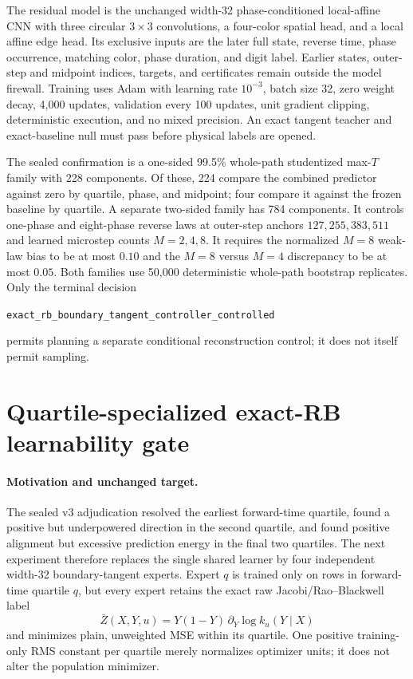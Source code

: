 \documentclass[11pt]{article}
\begin{document}
The residual model is the unchanged width-32 phase-conditioned
local-affine CNN with three circular $3\times3$ convolutions, a four-color
spatial head, and a local affine edge head. Its exclusive inputs are the later
full state, reverse time, phase occurrence, matching color, phase duration,
and digit label. Earlier states, outer-step and midpoint indices, targets, and
certificates remain outside the model firewall. Training uses Adam with
learning rate $10^{-3}$, batch size 32, zero weight decay, 4,000 updates,
validation every 100 updates, unit gradient clipping, deterministic execution,
and no mixed precision. An exact tangent teacher and exact-baseline null must
pass before physical labels are opened.

The sealed confirmation is a one-sided 99.5\% whole-path studentized max-$T$
family with 228 components. Of these, 224 compare the combined predictor
against zero by quartile, phase, and midpoint; four compare it against the
frozen baseline by quartile. A separate two-sided family has 784 components.
It controls one-phase and eight-phase reverse laws at outer-step anchors
$127,255,383,511$ and learned microstep counts $M=2,4,8$. It requires the
normalized $M=8$ weak-law bias to be at most $0.10$ and the $M=8$ versus $M=4$
discrepancy to be at most $0.05$. Both families use 50,000 deterministic
whole-path bootstrap replicates. Only the terminal decision
\begin{center}
\texttt{exact\_rb\_boundary\_tangent\_controller\_controlled}
\end{center}
permits planning a separate conditional reconstruction control; it does not
itself permit sampling.

\section{Quartile-specialized exact-RB learnability gate}

\paragraph{Motivation and unchanged target.}
The sealed v3 adjudication resolved the earliest forward-time quartile,
found a positive but underpowered direction in the second quartile, and found
positive alignment but excessive prediction energy in the final two
quartiles.  The next experiment therefore replaces the single shared learner
by four independent width-32 boundary-tangent experts.  Expert $q$ is trained
only on rows in forward-time quartile $q$, but every expert retains the exact
raw Jacobi/Rao--Blackwell label
\[
  \bar Z(X,Y,u)=Y(1-Y)\,\partial_Y\log k_u(Y\mid X)
\]
and minimizes plain, unweighted MSE within its quartile.  One positive
training-only RMS constant per quartile merely normalizes optimizer units; it
does not alter the population minimizer.
\end{document}
